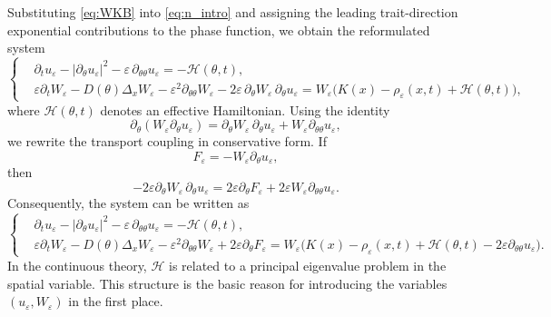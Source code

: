 \documentclass[11pt, dina4, amsfont12]{article}
\begin{document}
Substituting \eqref{eq:WKB} into \eqref{eq:n_intro} and assigning the leading trait-direction exponential contributions to the phase function, we obtain the reformulated system
\begin{equation}\label{eq:WKB_reformulation0}
\left\{
\begin{aligned}
& \partial_t u_\varepsilon
- |\partial_\theta u_\varepsilon|^2
- \varepsilon \, \partial_{\theta\theta} u_\varepsilon
= - \mathcal H(\theta,t), \\
& \varepsilon \partial_t W_\varepsilon
- D(\theta)\Delta_x W_\varepsilon
- \varepsilon^2 \partial_{\theta\theta} W_\varepsilon
- 2\varepsilon \, \partial_\theta W_\varepsilon \, \partial_\theta u_\varepsilon
= W_\varepsilon\bigl(K(x)-\rho_\varepsilon(x,t)+\mathcal H(\theta,t)\bigr),
\end{aligned}
\right.
\end{equation}
where \(\mathcal H(\theta,t)\) denotes an effective Hamiltonian. 
Using the identity
\[
\partial_\theta(W_\varepsilon\partial_\theta u_\varepsilon)
=
\partial_\theta W_\varepsilon\,\partial_\theta u_\varepsilon
+
W_\varepsilon\partial_{\theta\theta}u_\varepsilon,
\]
we rewrite the transport coupling in conservative form. If
\begin{equation}\label{def:F}
F_\varepsilon=-W_\varepsilon\partial_\theta u_\varepsilon,
\end{equation}
then
\[
-2\varepsilon\partial_\theta W_\varepsilon\,\partial_\theta u_\varepsilon
=
2\varepsilon\partial_\theta F_\varepsilon
+
2\varepsilon W_\varepsilon\partial_{\theta\theta}u_\varepsilon .
\]
Consequently, the system can be written as
\begin{equation}\label{eq:WKB_reformulation}
\left\{
\begin{aligned}
& \partial_t u_\varepsilon
- |\partial_\theta u_\varepsilon|^2
- \varepsilon \, \partial_{\theta\theta} u_\varepsilon
= - \mathcal H(\theta,t), \\
& \varepsilon \partial_t W_\varepsilon
- D(\theta)\Delta_x W_\varepsilon
- \varepsilon^2 \partial_{\theta\theta} W_\varepsilon
+2\varepsilon\partial_\theta F_\varepsilon
=
W_\varepsilon
\bigl(
K(x)-\rho_\varepsilon(x,t)
+\mathcal H(\theta,t)
-2\varepsilon\partial_{\theta\theta}u_\varepsilon
\bigr).
\end{aligned}
\right.
\end{equation}
In the continuous theory, \(\mathcal H\) is related to a principal eigenvalue problem in the spatial variable. This structure is the basic reason for introducing the variables \((u_\varepsilon,W_\varepsilon)\) in the first place.
\end{document}
